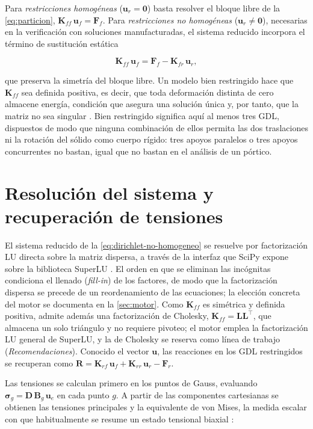 Para \emph{restricciones homogéneas} ($\bm{u}_r = \bm{0}$) basta resolver el bloque libre de la \autoref{eq:particion}, $\bm{K}_{ff}\,\bm{u}_f = \bm{F}_f$. Para \emph{restricciones no homogéneas} ($\bm{u}_r \neq \bm{0}$), necesarias en la verificación con soluciones manufacturadas, el sistema reducido incorpora el término de sustitución estática

\begin{equation}
\bm{K}_{ff}\,\bm{u}_f = \bm{F}_f - \bm{K}_{fr}\,\bm{u}_r,
\label{eq:dirichlet-no-homogeneo}
\end{equation}

que preserva la simetría del bloque libre. Un modelo bien restringido hace que $\bm{K}_{ff}$ sea definida positiva, es decir, que toda deformación distinta de cero almacene energía, condición que asegura una solución única y, por tanto, que la matriz no sea singular \autocite[pp.~726-727]{bathe2014fem}. Bien restringido significa aquí al menos tres GDL, dispuestos de modo que ninguna combinación de ellos permita las dos traslaciones ni la rotación del sólido como cuerpo rígido: tres apoyos paralelos o tres apoyos concurrentes no bastan, igual que no bastan en el análisis de un pórtico.

\section{Resolución del sistema y recuperación de tensiones}
\label{sec:resolucion-tensiones}

El sistema reducido de la \autoref{eq:dirichlet-no-homogeneo} se resuelve por factorización LU directa sobre la matriz dispersa, a través de la interfaz que SciPy expone sobre la biblioteca SuperLU \autocite[p.~264]{virtanen2020scipy}. El orden en que se eliminan las incógnitas condiciona el llenado (\emph{fill-in}) de los factores, de modo que la factorización dispersa se precede de un reordenamiento de las ecuaciones; la elección concreta del motor se documenta en la \autoref{sec:motor}. Como $\bm{K}_{ff}$ es simétrica y definida positiva, admite además una factorización de Cholesky, $\bm{K}_{ff} = \bm{L}\bm{L}^{\top}$, que almacena un solo triángulo y no requiere pivoteo; el motor emplea la factorización LU general de SuperLU, y la de Cholesky se reserva como línea de trabajo (\emph{Recomendaciones}). Conocido el vector $\bm{u}$, las reacciones en los GDL restringidos se recuperan como $\bm{R} = \bm{K}_{rf}\,\bm{u}_f + \bm{K}_{rr}\,\bm{u}_r - \bm{F}_r$.

Las tensiones se calculan primero en los puntos de Gauss, evaluando $\bm{\sigma}_g = \bm{D}\,\bm{B}_g\,\bm{u}_e$ en cada punto $g$. A partir de las componentes cartesianas se obtienen las tensiones principales \autocite[pp.~12-14]{timoshenko1970elasticity} y la equivalente de von Mises, la medida escalar con que habitualmente se resume un estado tensional biaxial \autocite[p.~117]{cook2002concepts}:


